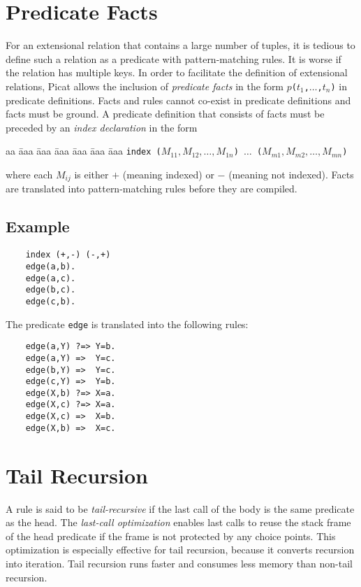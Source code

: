 \section{Predicate Facts}
For an extensional relation that contains a large number of tuples, it is tedious to define such a relation as a predicate with pattern-matching rules. It is worse if the relation has multiple keys. In order to facilitate the definition of extensional relations, Picat allows the inclusion of \emph{predicate facts} in the form \texttt{$p$($t_1$,$\ldots$,$t_n$)} in predicate definitions. Facts and rules cannot co-exist in predicate definitions and facts must be ground. A predicate definition that consists of facts must be preceded by an \emph{index declaration} in the form 
\begin{tabbing}
aa \= aaa \= aaa \= aaa \= aaa \= aaa \= aaa \kill
\> \texttt{index ($M_{11},M_{12},\ldots,M_{1n}$) $\ldots$ ($M_{m1},M_{m2},\ldots,M_{mn}$)} 
\end{tabbing}
where each $M_{ij}$ is either $+$ (meaning indexed) or $-$ (meaning not indexed). Facts are translated into pattern-matching rules before they are compiled. 

\subsection*{Example}
\begin{verbatim}
    index (+,-) (-,+)
    edge(a,b).
    edge(a,c).
    edge(b,c).
    edge(c,b).
\end{verbatim}
The predicate \texttt{edge} is translated into the following rules:
\begin{verbatim}
    edge(a,Y) ?=> Y=b.
    edge(a,Y) =>  Y=c.
    edge(b,Y) =>  Y=c.
    edge(c,Y) =>  Y=b.
    edge(X,b) ?=> X=a.
    edge(X,c) ?=> X=a.
    edge(X,c) =>  X=b.
    edge(X,b) =>  X=c.
\end{verbatim}

\section{Tail Recursion}
A rule is said to be \emph{tail-recursive} if the last call of the body is the same predicate as the head. The \emph{last-call optimization} enables last calls to reuse the stack frame of the head predicate if the frame is not protected by any choice points. This optimization is especially effective for tail recursion, because it converts recursion into iteration. Tail recursion runs faster and consumes less memory than non-tail recursion.

